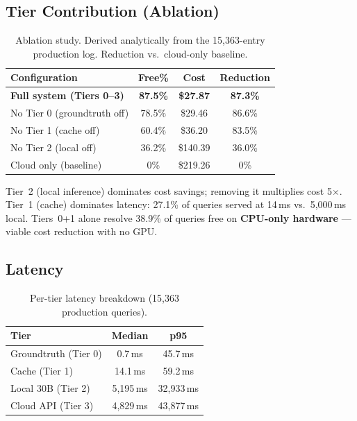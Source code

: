 \documentclass[11pt]{article}
\begin{document}
\subsection{Tier Contribution (Ablation)}

\begin{table}[t]
\centering
\small
\begin{tabular}{lccc}
\toprule
\textbf{Configuration} & \textbf{Free\%} & \textbf{Cost} & \textbf{Reduction} \\
\midrule
\textbf{Full system (Tiers 0--3)} & \textbf{87.5\%} & \textbf{\$27.87} & \textbf{87.3\%} \\
No Tier 0 (groundtruth off) & 78.5\% & \$29.46 & 86.6\% \\
No Tier 1 (cache off) & 60.4\% & \$36.20 & 83.5\% \\
No Tier 2 (local off) & 36.2\% & \$140.39 & 36.0\% \\
Cloud only (baseline) & 0\% & \$219.26 & 0\% \\
\bottomrule
\end{tabular}
\caption{Ablation study. Derived analytically from the 15,363-entry production log. Reduction vs.\ cloud-only baseline.}
\label{tab:ablation}
\end{table}

Tier~2 (local inference) dominates cost savings; removing it multiplies
cost 5$\times$. Tier~1 (cache) dominates latency: 27.1\% of queries
served at 14\,ms vs.\ 5,000\,ms local. Tiers~0+1 alone resolve 38.9\%
of queries free on \textbf{CPU-only hardware} --- viable cost reduction
with no GPU.

\subsection{Latency}

\begin{table}[t]
\centering
\small
\begin{tabular}{lcc}
\toprule
\textbf{Tier} & \textbf{Median} & \textbf{p95} \\
\midrule
Groundtruth (Tier 0) & 0.7\,ms & 45.7\,ms \\
Cache (Tier 1) & 14.1\,ms & 59.2\,ms \\
Local 30B (Tier 2) & 5,195\,ms & 32,933\,ms \\
Cloud API (Tier 3) & 4,829\,ms & 43,877\,ms \\
\bottomrule
\end{tabular}
\caption{Per-tier latency breakdown (15,363 production queries).}
\label{tab:latency}
\end{table}
\end{document}
